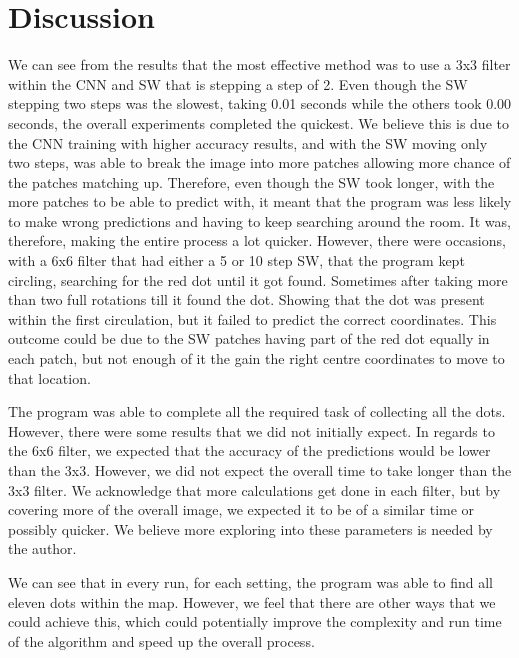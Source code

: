 \documentclass[a4paper,10pt]{article}
\begin{document}
\section{Discussion}

We can see from the results that the most effective method was to use a 3x3 filter within the CNN and SW that is stepping a step of 2. Even though the SW stepping two steps was the slowest, taking 0.01 seconds while the others took 0.00 seconds, the overall experiments completed the quickest. We believe this is due to the CNN training with higher accuracy results, and with the SW moving only two steps, was able to break the image into more patches allowing more chance of the patches matching up. Therefore, even though the SW took longer, with the more patches to be able to predict with, it meant that the program was less likely to make wrong predictions and having to keep searching around the room. It was, therefore, making the entire process a lot quicker. However, there were occasions, with a 6x6 filter that had either a 5 or 10 step SW, that the program kept circling, searching for the red dot until it got found. Sometimes after taking more than two full rotations till it found the dot. Showing that the dot was present within the first circulation, but it failed to predict the correct coordinates. This outcome could be due to the SW patches having part of the red dot equally in each patch, but not enough of it the gain the right centre coordinates to move to that location.

The program was able to complete all the required task of collecting all the dots. However, there were some results that we did not initially expect. In regards to the 6x6 filter, we expected that the accuracy of the predictions would be lower than the 3x3. However, we did not expect the overall time to take longer than the 3x3 filter. We acknowledge that more calculations get done in each filter, but by covering more of the overall image, we expected it to be of a similar time or possibly quicker. We believe more exploring into these parameters is needed by the author.

We can see that in every run, for each setting, the program was able to find all eleven dots within the map. However, we feel that there are other ways that we could achieve this, which could potentially improve the complexity and run time of the algorithm and speed up the overall process. 
\end{document}
